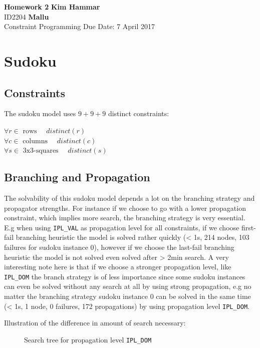 \documentclass[a4paper, 11pt]{article}
\begin{document}
\noindent
\large\textbf{Homework 2} \hfill \textbf{Kim Hammar} \\
\normalsize ID2204 \hfill  \textbf{Mallu} \\
Constraint Programming \hfill Due Date: 7 April 2017\\

\section*{Sudoku}
\subsection*{Constraints}
The sudoku model uses $9+9+9$ distinct constraints:

$\forall r \in \text{ rows }\quad distinct(r)$\\
$\forall c \in \text{ columns }\quad distinct(c)$\\
$\forall s \in \text{ 3x3-squares }\quad distinct(s)$

\subsection*{Branching and Propagation}
The solvability of this sudoku model depends a lot on the branching strategy and propagator strengths. For instance if we choose to go with a lower propagation constraint, which implies more search, the branching strategy is very essential. E.g when using \texttt{IPL\_VAL} as propagation level for all constraints, if we choose first-fail branching heuristic the model is solved rather quickly (< 1s, 214 nodes, 103 failures for sudoku instance 0), however if we choose the last-fail branching heuristic the model is not solved even solved after > 2min search. A very interesting note here is that if we choose a stronger propagation level, like \texttt{IPL\_DOM} the branch strategy is of less importance since some sudoku instances can even be solved without any search at all by using strong propagation, e.g no matter the branching strategy sudoku instance $0$ can be solved in the same time (< 1s, 1 node, 0 failures, 172 propagations) by using propagation level \texttt{IPL\_DOM}.

Illustration of the difference in amount of search necessary:

\begin{figure}[H]
  \begin{center}
    \caption{Search tree for propagation level \texttt{IPL\_DOM}}
    \label{fig:dom1}
  \end{center}
\end{figure}
\end{document}
